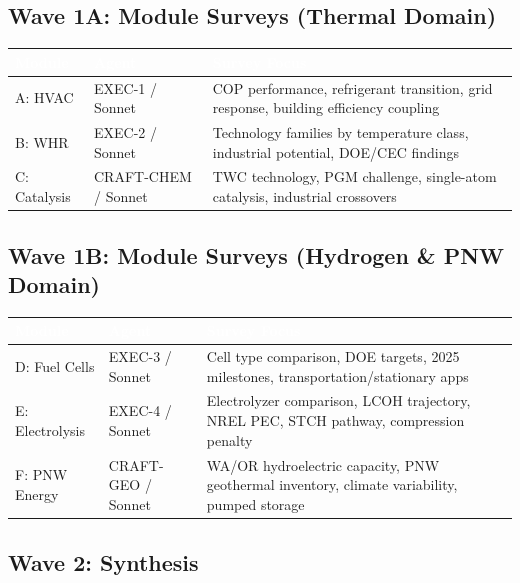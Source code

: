 \documentclass[11pt,letterpaper]{article}
\newcommand{\tableheader}[1]{\textbf{\sffamily\textcolor{white}{#1}}}
\begin{document}
\subsection{Wave 1A: Module Surveys (Thermal Domain)}

\begin{center}
\begin{tabularx}{\textwidth}{L{2cm}L{3cm}X}
\toprule
{}
\tableheader{Module} & \tableheader{Agent} & \tableheader{Survey Focus} \\
\midrule
A: HVAC & EXEC-1 / Sonnet & COP performance, refrigerant transition, grid response, building efficiency coupling \\
B: WHR & EXEC-2 / Sonnet & Technology families by temperature class, industrial potential, DOE/CEC findings \\
C: Catalysis & CRAFT-CHEM / Sonnet & TWC technology, PGM challenge, single-atom catalysis, industrial crossovers \\
\bottomrule
\end{tabularx}
\end{center}

\subsection{Wave 1B: Module Surveys (Hydrogen \& PNW Domain)}

\begin{center}
\begin{tabularx}{\textwidth}{L{2cm}L{3cm}X}
\toprule
{}
\tableheader{Module} & \tableheader{Agent} & \tableheader{Survey Focus} \\
\midrule
D: Fuel Cells & EXEC-3 / Sonnet & Cell type comparison, DOE targets, 2025 milestones, transportation/stationary apps \\
E: Electrolysis & EXEC-4 / Sonnet & Electrolyzer comparison, LCOH trajectory, NREL PEC, STCH pathway, compression penalty \\
F: PNW Energy & CRAFT-GEO / Sonnet & WA/OR hydroelectric capacity, PNW geothermal inventory, climate variability, pumped storage \\
\bottomrule
\end{tabularx}
\end{center}

\subsection{Wave 2: Synthesis}
\end{document}
